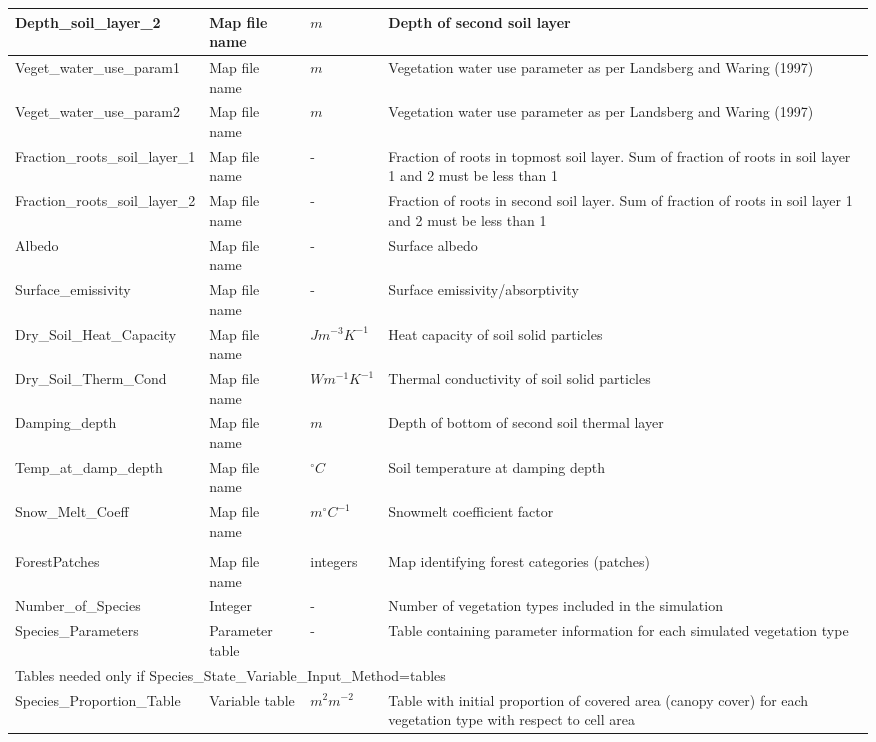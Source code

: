 \begin{longtable}{|p{4cm} l l p{5.5cm}|}
\hline
Depth\_soil\_layer\_2 & Map file name & $m$ & Depth of second soil layer \\
\hline
Veget\_water\_use\_param1 & Map file name & $m$ & Vegetation water use parameter as per Landsberg and Waring (1997) \\
\hline
Veget\_water\_use\_param2 & Map file name & $m$ & Vegetation water use parameter as per Landsberg and Waring (1997) \\
\hline
Fraction\_roots\_soil\_layer\_1 & Map file name & - & Fraction of roots in topmost soil layer. Sum of fraction of roots in soil layer 1 and 2 must be less than 1 \\
\hline
Fraction\_roots\_soil\_layer\_2 & Map file name & - & Fraction of roots in second soil layer. Sum of fraction of roots in soil layer 1 and 2 must be less than 1 \\
\hline
Albedo & Map file name & - & Surface albedo \\
\hline
Surface\_emissivity & Map file name & - & Surface emissivity/absorptivity \\
\hline
Dry\_Soil\_Heat\_Capacity & Map file name & $ Jm^{-3}K^{-1} $ & Heat capacity of soil solid particles \\
\hline
Dry\_Soil\_Therm\_Cond & Map file name & $ Wm^{-1}K^{-1} $ & Thermal conductivity of soil solid particles \\
\hline
Damping\_depth & Map file name & $ m $ & Depth of bottom of second soil thermal layer \\
\hline
Temp\_at\_damp\_depth & Map file name & $ ^{\circ}C $ & Soil temperature at damping depth \\
\hline
Snow\_Melt\_Coeff & Map file name & $ m^{\circ}C^{-1} $ & Snowmelt coefficient factor \\
\hline
\newpage
\multicolumn{4}{l}{\textbf{Forest parameters (Files must be located in \textit{Maps\_Folder})}} \\
\hline
ForestPatches &  Map file name & integers & Map identifying forest categories (patches)\\
\hline
Number\_of\_Species & Integer & -  & Number of vegetation types included in the simulation \\
\hline
Species\_Parameters & Parameter table & - & Table containing parameter information for each simulated vegetation type \\
\hline
\multicolumn{4}{l}{Tables needed only if \textsf{Species\_State\_Variable\_Input\_Method=tables}} \\
\hline
Species\_Proportion\_Table & Variable table & $ m^{2}m^{-2}  $ & Table with initial proportion of covered area (canopy cover) for each vegetation type with respect to cell area \\

\end{longtable}
